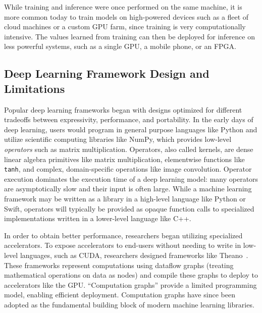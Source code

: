 While training and inference were once performed on the same machine, it is more common today to
train models on high-powered devices such as a fleet of cloud machines or a custom GPU farm, since
training is very computationally intensive. The values learned from training can then be deployed
for inference on less powerful systems, such as a single GPU, a mobile phone, or an FPGA.

\subsection{Deep Learning Framework Design and Limitations}

Popular deep learning frameworks began with designs
  optimized for different tradeoffs between
  expressivity, performance, and portability.
In the early days of deep learning, users would program
  in general purpose languages like Python and utilize
  scientific computing libraries like NumPy,
  which provides low-level \textit{operators} such as matrix multiplication.
Operators, also called kernels, are dense linear algebra primitives like matrix multiplication,
  elementwise functions like \verb|tanh|,
  and complex, domain-specific operations like image convolution.
Operator execution dominates the execution time of a deep learning model: many
  operators are asymptotically slow and their input is often large.
While a machine learning framework may be written as a library in a high-level language
  like Python or Swift, operators will typically be provided as opaque function calls to
  specialized implementations written in a lower-level language like C++.

In order to obtain better performance, researchers began utilizing specialized accelerators.
To expose accelerators to end-users without needing to write in low-level languages,
such as CUDA, researchers designed frameworks like Theano~\cite{theano}.
These frameworks represent computations using dataflow graphs
  (treating mathematical operations on data as nodes)
  and compile these graphs to deploy to
  accelerators like the GPU.
``Computation graphs'' provide a limited programming model,
  enabling efficient deployment.
Computation graphs have since been adopted as the fundamental building block of modern
  machine learning libraries.

